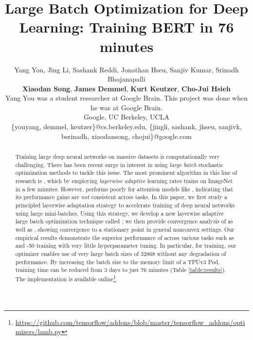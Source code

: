 \documentclass{article} \usepackage{iclr2020_conference,times}
\title{Large Batch Optimization for Deep Learning: Training BERT in 76 minutes}
\author{\small Yang You, 
Jing Li, Sashank Reddi, Jonathan Hseu, Sanjiv Kumar, Srinadh Bhojanapalli\\{\bf \small Xiaodan Song}, {\bf \small James Demmel}, {\bf \small Kurt Keutzer}, {\bf \small Cho-Jui Hsieh}\\
{\scriptsize Yang You was a student researcher at Google Brain. This project was done when he was at Google Brain.}
\\
\normalsize{Google},
\normalsize{UC Berkeley},
\normalsize{UCLA}\\
\scriptsize{\{youyang, demmel, keutzer\}@cs.berkeley.edu, \{jingli, sashank, jhseu, sanjivk, bsrinadh, xiaodansong, chojui\}@google.com}
}
\begin{document}
\maketitle

\begin{abstract}
Training large deep neural networks on massive datasets is  computationally very challenging. There has been recent surge in interest in using \emph{large batch} stochastic optimization methods to tackle this issue. The most prominent algorithm in this line of research is , which by  employing \emph{layerwise adaptive} learning rates trains  on ImageNet in a few minutes. However,  performs poorly for attention models like , indicating that its performance gains are \emph{not} consistent across tasks. In this paper, we first study a principled layerwise adaptation strategy to accelerate training of deep neural networks using large mini-batches. Using this strategy, we develop a new layerwise adaptive large batch optimization technique called ; we then provide convergence analysis of  as well as , showing convergence to a stationary point in general nonconvex settings. Our empirical results demonstrate the superior performance of  across various tasks such as  and -50 training with very little hyperparameter tuning. In particular, for  training, our optimizer enables use of very large batch sizes of 32868 without any degradation of performance.  By increasing the batch size to the memory limit of a TPUv3 Pod,  training time can be reduced from 3 days to just 76 minutes (Table \ref{table:results}). The  implementation is available online\footnote{\url{https://github.com/tensorflow/addons/blob/master/tensorflow_addons/optimizers/lamb.py}}.
\end{abstract}

\iffalse
Training large deep neural networks on massive datasets is  computationally very challenging. There has been recent surge in interest in using \emph{large batch} stochastic optimization methods to tackle this issue. The use of large batch of gradients (which are computed in parallel) in these methods enable them to use much larger learning rates, thereby, drastically reducing the training time. However, current methods require extensive tuning of learning rates and their performance gains are \emph{not} consistent across tasks. In this paper, we study a principled adaptation strategy to accelerate training of deep neural networks using large mini-batches. Using this strategy, we develop a new layer-wise adaptive large batch optimization technique called . We provide a formal convergence analysis of  as well as the previous published layerwise optimizer , showing convergence to a stationary point in general nonconvex settings. Our empirical results demonstrate the superior performance of  across various tasks such as BERT and ResNet-50 training with very little tuning. In particular, for BERT training, our optimizer enables use of very large batch sizes of 32868 without any degradation of performance.  By increasing the batch size to the memory limit of a TPUv3 Pod, BERT training time can be reduced from 3 days to just 76 minutes (Table \ref{table:results}).
\fi
\end{document}
